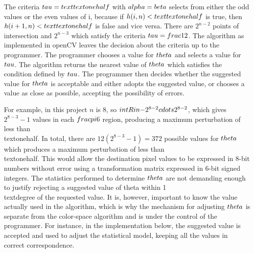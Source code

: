 The criteria $\\tau =\\text{\\textonehalf}$ with $\\alpha=\\beta$ selects from either the odd values or the even values of i, because if $h(i,n)<\\text{\\textonehalf}$ is true, then $h(i+1,n)<\\text{\\textonehalf}$  is false and vice versa. There are $2^{n-2}$ points of intersection and $2^{n-3}$ which satisfy the criteria $\\tau = \\frac{1}{2}$. The algorithm as implemented in openCV leaves the decision about the criteria up to the programmer. The programmer chooses a value for $\\theta$ and selects a value for $\\tau$. The algorithm returns the nearest value of $\\theta$ which satisfies the condition defined by $\\tau$. The programmer then decides whether the suggested value for $\\theta$ is acceptable and either adopts the suggested value, or chooses a value as close as possible, accepting the possibility of errors.

For example, in this project $n$ is 8, so $\\intR \\in \\{ -2^{8-2} \\cdots 2^{8-2} \\}$, which gives $2^{8-3}-1$ values in each $\\frac{\\pi}{6}$ region, producing a maximum perturbation of less than \\textonehalf. In total, there are $12 (2^{8-3}-1) = 372$ possible values for $\\theta$ which produces a maximum perturbation of less than \\textonehalf. This would allow the destination pixel values to be expressed in 8-bit numbers without error using a transformation matrix expressed in 6-bit signed integers. The statistics performed to determine $\\theta$ are not demanding enough to justify rejecting a suggested value of theta within 1\\textdegree  of the requested value. It is, however, important to know the value actually used in the algorithm, which is why the mechanism for adjusting $\\theta$ is separate from the color-space algorithm and is under the control of the programmer. For instance, in the implementation below, the suggested value is accepted and used to adjust the statistical model, keeping all the values in correct correspondence.


